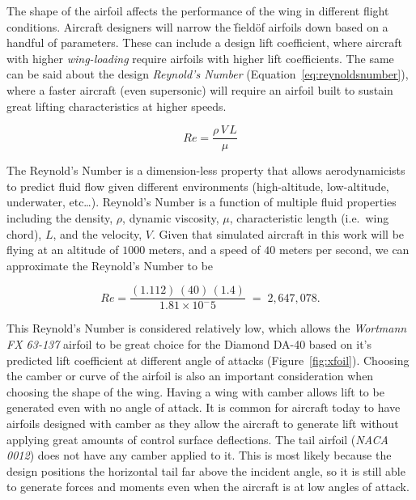 \documentclass[12pt]{report}
\begin{document}
The shape of the airfoil affects the performance of the wing in different flight conditions. Aircraft designers will narrow the \"field\" of airfoils down based on a handful of parameters. These can include a design lift coefficient, where aircraft with higher \textit{wing-loading} require airfoils with higher lift coefficients. The same can be said about the design \textit{Reynold's Number} (Equation~\ref{eq:reynoldsnumber}), where a faster aircraft (even supersonic) will require an airfoil built to sustain great lifting characteristics at higher speeds.

\begin{equation}\label{eq:reynoldsnumber}
  Re = \frac{\rho \, V \, L}{\mu}
\end{equation}

The Reynold's Number is a dimension-less property that allows aerodynamicists to predict fluid flow given different environments (high-altitude, low-altitude, underwater, etc\ldots). Reynold's Number is a function of multiple fluid properties including the density, \( \rho \), dynamic viscosity, \( \mu \), characteristic length (i.e.\ wing chord), \(L\), and the velocity, \(V\). Given that simulated aircraft in this work will be flying at an altitude of \(1000\) meters, and a speed of \(40\) meters per second, we can approximate the Reynold's Number to be

\begin{equation}\label{eq:recalc}
  Re = \frac{(1.112) \, (40) \, (1.4)}{1.81\times10^-5} \; = \;  2,647,078.
\end{equation}

This Reynold's Number is considered relatively low, which allows the \textit{Wortmann FX 63{-}137} airfoil to be great choice for the Diamond DA-40 based on it's predicted lift coefficient at different angle of attacks (Figure~\ref{fig:xfoil}). Choosing the camber or curve of the airfoil is also an important consideration when choosing the shape of the wing. Having a wing with camber allows lift to be generated even with no angle of attack. It is common for aircraft today to have airfoils designed with camber as they allow the aircraft to generate lift without applying great amounts of control surface deflections. The tail airfoil (\textit{NACA 0012}) does not have any camber applied to it. This is most likely because the design positions the horizontal tail far above the incident angle, so it is still able to generate forces and moments even when the aircraft is at low angles of attack.
\end{document}
